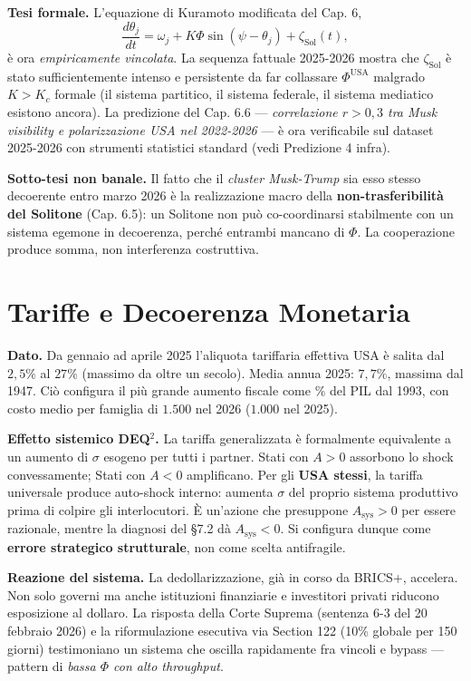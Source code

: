 \Hypoth{} \textbf{Tesi formale.} L'equazione di Kuramoto modificata del
Cap. 6,
\[\frac{d\theta_j}{dt} = \omega_j + K\Phi \sin(\psi - \theta_j) + \zeta_{\text{Sol}}(t),\]
è ora \emph{empiricamente vincolata}. La sequenza fattuale 2025-2026
mostra che \(\zeta_{\text{Sol}}\) è stato sufficientemente intenso e
persistente da far collassare \(\Phi^{\text{USA}}\) malgrado \(K > K_c\)
formale (il sistema partitico, il sistema federale, il sistema mediatico
esistono ancora). La predizione del Cap. 6.6 --- \emph{correlazione
\(r > 0{,}3\) tra Musk visibility e polarizzazione USA nel 2022-2026}
--- è ora verificabile sul dataset 2025-2026 con strumenti statistici
standard (vedi Predizione 4 infra).

\Conj{} \textbf{Sotto-tesi non banale.} Il fatto che il \emph{cluster
Musk-Trump} sia esso stesso decoerente entro marzo 2026 è la
realizzazione macro della \textbf{non-trasferibilità del Solitone} (Cap.
6.5): un Solitone non può co-coordinarsi stabilmente con un sistema
egemone in decoerenza, perché entrambi mancano di \(\Phi\). La
cooperazione produce somma, non interferenza costruttiva.



\section{Tariffe e Decoerenza
Monetaria}\label{tariffe-e-decoerenza-monetaria}

\Proved{} \textbf{Dato.} Da gennaio ad aprile 2025 l'aliquota tariffaria
effettiva USA è salita dal \(2{,}5\%\) al \(27\%\) (massimo da oltre un
secolo). Media annua 2025: \(7{,}7\%\), massima dal 1947. Ciò configura
il più grande aumento fiscale come \(\%\) del PIL dal 1993, con costo
medio per famiglia di \(1.500\) nel 2026 (\(1.000\) nel 2025).

\Hypoth{} \textbf{Effetto sistemico DEQ$^2$.} La tariffa generalizzata è
formalmente equivalente a un aumento di \(\sigma\) esogeno per tutti i
partner. Stati con \(A > 0\) assorbono lo shock convessamente; Stati con
\(A < 0\) amplificano. Per gli \textbf{USA stessi}, la tariffa
universale produce auto-shock interno: aumenta \(\sigma\) del proprio
sistema produttivo prima di colpire gli interlocutori. È un'azione che
presuppone \(A_{\text{sys}} > 0\) per essere razionale, mentre la
diagnosi del \S{}7.2 dà \(A_{\text{sys}} < 0\). Si configura dunque come
\textbf{errore strategico strutturale}, non come scelta antifragile.

\Proved{} \textbf{Reazione del sistema.} La dedollarizzazione, già in
corso da BRICS+, accelera. Non solo governi ma anche istituzioni
finanziarie e investitori privati riducono esposizione al dollaro. La
risposta della Corte Suprema (sentenza 6-3 del 20 febbraio 2026) e la
riformulazione esecutiva via Section 122 (10\% globale per 150 giorni)
testimoniano un sistema che oscilla rapidamente fra vincoli e bypass ---
pattern di \emph{bassa \(\Phi\) con alto throughput}.


